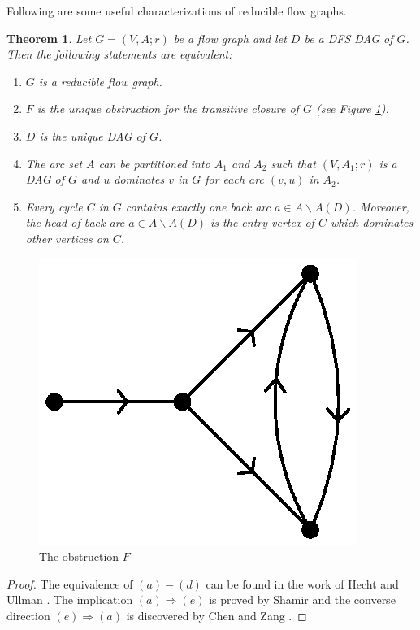 \documentclass[11pt]{article}
\newtheorem{theorem}{Theorem}[section]
\begin{document}
Following are some useful characterizations of reducible flow graphs.
\begin{theorem}
\label{thm:1}
Let $G=(V,A;r)$ be a flow graph and let $D$ be a DFS DAG of $G$. Then the following statements are equivalent:
\begin{enumerate}[label=\emph{(}\alph*\emph{)}]
  \item $G$ is a reducible flow graph.
  \item $F$ is the unique obstruction for the transitive closure of $G$ (see Figure \ref{fig:1}).
  \item $D$ is the unique DAG of $G$.
  \item The arc set $A$ can be partitioned into $A_1$ and $A_2$ such that $(V,A_1;r)$ is a DAG of $G$ and $u$ dominates $v$ in $G$ for each arc $(v,u)$ in $A_2$.
  \item Every cycle $C$ in $G$ contains exactly one back arc $a\in A\backslash A(D)$. Moreover, the head of back arc $a\in A\backslash A(D)$ is the entry vertex of $C$ which dominates other vertices on $C$.
\end{enumerate}
\end{theorem}

\begin{figure}
\centering
\includegraphics[scale=.55]{FASPacking-fig1.eps}
\caption{The obstruction $F$}
\label{fig:1}
\end{figure}

\begin{proof}
The equivalence of $(a)-(d)$ can be found in the work of  Hecht and Ullman \cite{HecU1,HecU2}. The implication $(a)\Rightarrow (e)$ is proved by Shamir \cite{Sham} and the converse direction $(e)\Rightarrow (a)$ is discovered by Chen and Zang \cite{CheZ}.
\end{proof}
\end{document}
